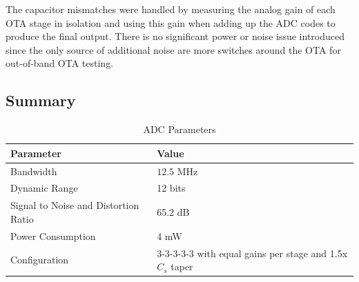 \documentclass[11pt]{article}
\begin{document}
The capacitor mismatches were handled by measuring the analog gain of each OTA stage in isolation and using this gain when adding up the ADC codes to produce the final output.
There is no significant power or noise issue introduced since the only source of additional noise are more switches around the OTA for out-of-band OTA testing.

\subsection{Summary}
\begin{table}[H]
  \begin{center}
    \caption{ADC Parameters}
    \label{tab:adc_params}
    \begin{tabular}{l l}
      \toprule
      \textbf{Parameter} & \textbf{Value} \\
      \midrule
      Bandwidth & $12.5$ MHz\\
      Dynamic Range & 12 bits\\
      Signal to Noise and Distortion Ratio & 65.2 dB \\
      Power Consumption & 4 mW \\
      Configuration & 3-3-3-3-3 with equal gains per stage and 1.5x $C_s$ taper \\
      \bottomrule
    \end{tabular}
  \end{center}
\end{table}
\end{document}
